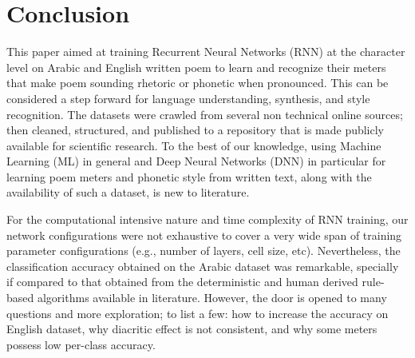 \section{Conclusion}\label{sec:conclusion}
This paper aimed at training Recurrent Neural Networks (RNN) at the character level on Arabic and
English written poem to learn and recognize their meters that make poem sounding rhetoric or
phonetic when pronounced. This can be considered a step forward for language understanding,
synthesis, and style recognition. The datasets were crawled from several non technical online
sources; then cleaned, structured, and published to a repository that is made publicly available for
scientific research. To the best of our knowledge, using Machine Learning (ML) in general and Deep
Neural Networks (DNN) in particular for learning poem meters and phonetic style from written text,
along with the availability of such a dataset, is new to literature.

For the computational intensive nature and time complexity of RNN training, our network
configurations were not exhaustive to cover a very wide span of training parameter configurations
(e.g., number of layers, cell size, etc). Nevertheless, the classification accuracy obtained on the
Arabic dataset was remarkable, specially if compared to that obtained from the deterministic and
human derived rule-based algorithms available in literature. However, the door is opened to many
questions and more exploration; to list a few: how to increase the accuracy on English dataset, why diacritic
effect is not consistent, and why some meters possess low per-class accuracy.

